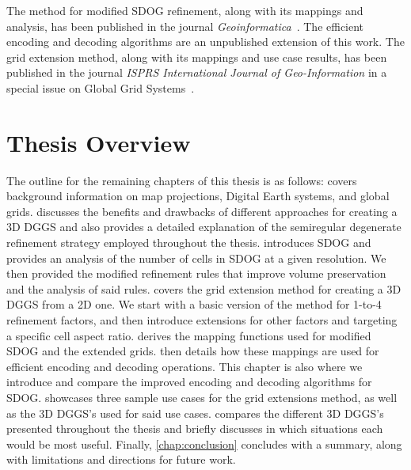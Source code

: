 The method for modified SDOG refinement, along with its mappings and analysis, has been published in the journal \textit{Geoinformatica}~\cite{ulmer2020toward}.
The efficient encoding and decoding algorithms are an unpublished extension of this work.
The grid extension method, along with its mappings and use case results, has been published in the journal \textit{ISPRS International Journal of Geo-Information} in a special issue on Global Grid Systems~\cite{ulmer2020general}.


\section{Thesis Overview} \label{chap:1:overview}
The outline for the remaining chapters of this thesis is as follows:
 covers background information on map projections, Digital Earth systems, and global grids.
 discusses the benefits and drawbacks of different approaches for creating a 3D DGGS and also provides a detailed explanation of the semiregular degenerate refinement strategy employed throughout the thesis.
 introduces SDOG and provides an analysis of the number of cells in SDOG at a given resolution.
We then provided the modified refinement rules that improve volume preservation and the analysis of said rules.
 covers the grid extension method for creating a 3D DGGS from a 2D one.
We start with a basic version of the method for 1-to-4 refinement factors, and then introduce extensions for other factors and targeting a specific cell aspect ratio.
 derives the mapping functions used for modified SDOG and the extended grids.
 then details how these mappings are used for efficient encoding and decoding operations.
This chapter is also where we introduce and compare the improved encoding and decoding algorithms for SDOG.
 showcases three sample use cases for the grid extensions method, as well as the 3D DGGS's used for said use cases.
 compares the different 3D DGGS's presented throughout the thesis and briefly discusses in which situations each would be most useful.
Finally, \cref{chap:conclusion} concludes with a summary, along with limitations and directions for future work.

